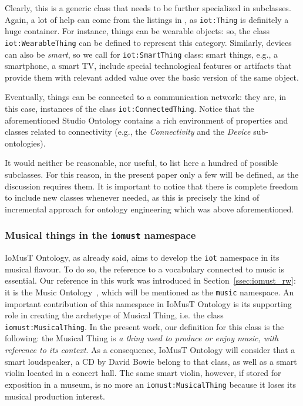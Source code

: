 Clearly, this is a generic class that needs to be further specialized in subclasses. Again, a lot of help can come from the listings in \cite{liu2016comparison}, as \texttt{iot:Thing} is definitely a huge container. For instance, things can be wearable objects: so, the class \texttt{iot:WearableThing} can be defined to represent this category. Similarly, devices can also be \textit{smart}, so we call for \texttt{iot:SmartThing} class: smart things, e.g., a smartphone, a smart TV, include special technological features or artifacts that provide them with relevant added value over the basic version of the same object. 

Eventually, things can be connected to a communication network: they are, in this case, instances of the class \texttt{iot:ConnectedThing}. Notice that the aforementioned Studio Ontology  contains a rich environment of properties and classes related to connectivity (e.g., the \textit{Connectivity} and the \textit{Device} sub-ontologies). %

It would neither be reasonable, nor useful, to list here a hundred of possible subclasses. For this reason, in the present paper only a few will be defined, as the discussion requires them. It is important to notice that there is complete freedom to include new classes whenever needed, as this is precisely the kind of incremental approach for ontology engineering which was above aforementioned.

\subsubsection{\textsf{Musical things in the \texttt{iomust} namespace}}

IoMusT Ontology, as already said, aims to develop the \texttt{iot} namespace in its musical flavour. To do so, the reference to a vocabulary connected to music is essential. Our reference in this work was introduced in Section~\ref{ssec:iomust_rw}: it is the Music Ontology~, which will be mentioned as the \texttt{music} namespace. An important contribution of this namespace in IoMusT Ontology is its supporting role in creating the archetype of Musical Thing, i.e. the class \texttt{iomust:MusicalThing}. In the present work, our definition for this class is the following: the Musical Thing is \textit{a thing used to produce or enjoy music, with reference to its context}. As a consequence, IoMusT Ontology will consider that a smart loudspeaker, a CD by David Bowie belong to that class, as well as a smart violin located in a concert hall. The same smart violin, however, if stored for exposition in a museum, is no more an \texttt{iomust:MusicalThing} because it loses its musical production interest. 

